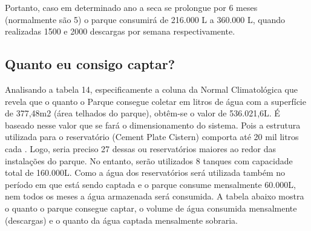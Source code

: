 Portanto, caso em determinado ano a seca se prolongue por 6 meses (normalmente são 5) o parque consumirá de 216.000 L a 360.000 L, quando realizadas 1500 e 2000 descargas por semana respectivamente. 

\subsection{Quanto eu consigo captar?}

Analisando a tabela 14, especificamente a coluna da Normal Climatológica que revela que o quanto o Parque consegue coletar em litros de água com a superfície de 377,48m2 (área telhados do parque), obtêm-se o valor de 536.021,6L. É baseado nesse valor que se fará o dimensionamento do sistema. Pois a estrutura utilizada para o reservatório (Cement Plate Cistern) comporta até 20 mil litros cada \cite{gnadlinger1999technical}. Logo, seria preciso 27 dessas ou reservatórios maiores ao redor das instalações do parque. No entanto, serão utilizados 8 tanques com capacidade total de 160.000L. Como a água dos reservatórios será utilizada também no período em que está sendo captada e o parque consume mensalmente 60.000L, nem todos os meses a água armazenada será consumida. A tabela abaixo mostra o quanto o parque consegue captar, o volume de água consumida mensalmente (descargas) e o quanto da água captada mensalmente sobraria.


